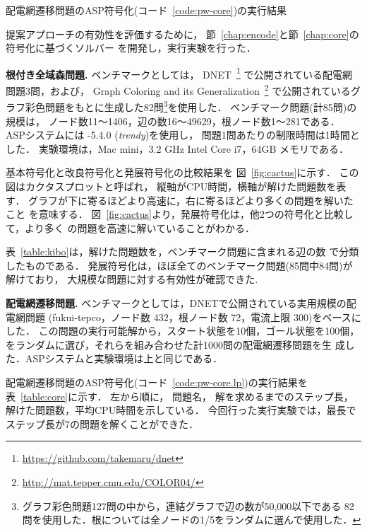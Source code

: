 \begin{table}[t]
  \centering
  \caption{配電網遷移問題のASP符号化(コード~\ref{code:pw-core})の実行結果}
  \label{table:core}
  
\end{table}

提案アプローチの有効性を評価するために，
節~\ref{chap:encode}と節~\ref{chap:core}の符号化に基づくソルバー
を開発し，実行実験を行った．

\textbf{根付き全域森問題.}
ベンチマークとしては，
DNET~\footnote{\url{https://github.com/takemaru/dnet}}
で公開されている配電網問題3問，および，
Graph Coloring and its Generalization~\footnote{\url{http://mat.tepper.cmu.edu/COLOR04/}}
で公開されているグラフ彩色問題をもとに生成した82問\footnote{%
グラフ彩色問題127問の中から，連結グラフで辺の数が50,000以下である
82問を使用した．根については全ノードの1/5をランダムに選んで使用した．
}を使用した．
ベンチマーク問題(計85問)の規模は，
ノード数11〜1406，辺の数16〜49629，根ノード数1〜281である．
%
ASPシステムには {\clingo}-5.4.0 (\textit{trendy})を使用し，
問題1問あたりの制限時間は1時間とした．
実験環境は，Mac mini，3.2 GHz Intel Core i7，64GB メモリである．

基本符号化と改良符号化と発展符号化の比較結果を
図~\ref{fig:cactus}に示す．
この図はカクタスプロットと呼ばれ，
縦軸がCPU時間，横軸が解けた問題数を表す．
グラフが下に寄るほどより高速に，右に寄るほどより多くの問題を解いたこと
を意味する．
図~\ref{fig:cactus}より，発展符号化は，他2つの符号化と比較して，より多く
の問題を高速に解いていることがわかる．

表~\ref{table:kibo}は，解けた問題数を，ベンチマーク問題に含まれる辺の数
で分類したものである．
発展符号化は，ほぼ全てのベンチマーク問題(85問中84問)が解けており，
大規模な問題に対する有効性が確認できた. 

\textbf{配電網遷移問題.}
ベンチマークとしては，DNETで公開されている実用規模の配電網問題
({\sf fukui-tepco}，ノード数 432，根ノード数 72，電流上限 300)をベースにした．
この問題の実行可能解から，スタート状態を10個，ゴール状態を100個，
をランダムに選び，それらを組み合わせた計1000問の配電網遷移問題を生
成した．ASPシステムと実験環境は上と同じである．

配電網遷移問題のASP符号化(コード~\ref{code:pw-core.lp})の実行結果を
表~\ref{table:core}に示す．
左から順に，
問題名，
解を求めるまでのステップ長，解けた問題数，平均CPU時間を示している．
今回行った実行実験では，最長でステップ長が7の問題を解くことができた．


